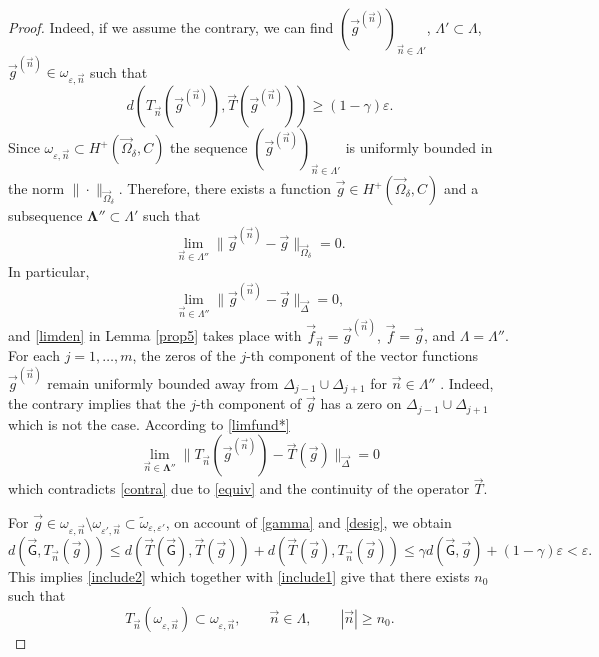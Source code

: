 \documentclass{amsart}
\numberwithin{equation}{section}
\theoremstyle{definition}
\newcommand{\n}{\vec{n}}          %
\begin{document}
\begin{proof}
 Indeed, if we assume the contrary, we can find  $(\vec{g}^{(\n)})_{\n\in\Lambda'}$, $\Lambda' \subset \Lambda$, $\vec{g}^{(\n)} \in \omega_{\varepsilon,\n}$ such that
 	\begin{equation}
 		\label{contra}
 		d(T_{\n}(\vec{g}^{(\n)} ), \vec{T} (\vec{g}^{(\n)}) )\geq  (1-\gamma)\varepsilon.
 	\end{equation}
 	Since $\omega_{\varepsilon, \n}\subset H^+(\vec{\Omega}_{\delta}, C)$   the sequence $(\vec{g}^{(\n)})_{\n\in\Lambda'}$ is uniformly bounded in the norm $\|\cdot\|_{\vec{\Omega}_\delta}$. Therefore, there exists a function $\vec{g}\in H^+(\vec{\Omega}_{\delta}, C)$ and a subsequence $\mathbf{\Lambda}''\subset \Lambda'$ such that
 	\[
 	  \lim_{\n\in\Lambda''} \|\vec{g}^{(\n)}-\vec{g}\|_{\vec{\Omega}_\delta} = 0.
 	\]
 	In particular,
 	\[
 	  \lim_{\n\in\Lambda''} \|\vec{g}^{(\n)}-\vec{g}\|_{ \vec{\Delta}} = 0,
 	\]
 and \eqref{limden} in Lemma \ref{prop5} takes place with $\vec{f}_{\vec{n}} = \vec{g}^{(\n)}$, $\vec{f} = \vec{g}$, and $\Lambda = \Lambda''$. For each $j=1,\ldots,m$, the zeros of the $j$-th component of the vector
 functions $\vec{g}^{(\n)}$ remain uniformly bounded away from $\Delta_{j-1} \cup \Delta_{j+1}$ for $\n \in \Lambda''$ . Indeed, the contrary  implies  that the $j$-th component of $\vec{g}$ has a zero on $\Delta_{j-1} \cup \Delta_{j+1}$ which is not the case. 	According to \eqref{limfund*}
 	\[
 	  \lim_{\n\in\mathbf{\Lambda}''} \|T_{\n}(\vec{g}^{(\vec{n})}) -  \vec{T} (\vec{g})\|_{ \vec{\Delta}} =0
 	\]
 	which contradicts \eqref{contra} due to \eqref{equiv} and the continuity of the operator $\vec{T}$.

  For $\vec{g} \in \omega_{\varepsilon,\n} \setminus \omega_{\varepsilon',\n} \subset \tilde{\omega}_{\varepsilon,\varepsilon'}$, on account of \eqref{gamma} and \eqref{desig}, we obtain
 \[
 d(\vec{\mathsf{G}},T_{\n}(\vec{g})) \leq d(\vec{T}(\vec{\mathsf{G}}), \vec{T}(\vec{g})) + d(\vec{T}(\vec{g}),T_{\n}(\vec{g})) \leq \gamma d(\vec{ \mathsf{G}},  \vec{g}) + (1 - \gamma)\varepsilon < \varepsilon.
 \]
 This implies \eqref{include2} which together with \eqref{include1} give that there exists $n_0$ such that
 \[
   T_{\n}(\omega_{\varepsilon, \n} ) \subset \omega_{\varepsilon, \n}, \qquad \n \in \Lambda, \qquad |\n| \geq n_0.
 \]




\end{proof}
\end{document}
